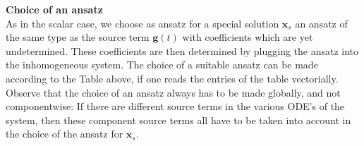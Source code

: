 \textbf{Choice of an ansatz}\\
As in the scalar case, we choose as ansatz for a special solution $\mathbf{x}_s$ an ansatz of the same type as the source term $\mathbf{g}(t)$ with coefficients which are yet undetermined. These coefficients are then determined by plugging the ansatz into the inhomogeneous system. The choice of a suitable ansatz can be made according to the Table above, if one reads the entries of the table vectorially.\\
Observe that the choice of an ansatz always has to be made globally, and not componentwise: If there are different source terms in the various ODE’s of the system, then these component source terms all have to be taken into account in the choice of the ansatz for $\mathbf{x}_s$.\\


